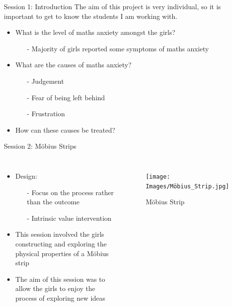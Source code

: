 \documentclass{beamer}  %
\begin{document}

\begin{frame}{Session 1: Introduction}
    The aim of this project is very individual, so it is important to get to know the students I am working with.
    \begin{itemize}
        \item What is the level of maths anxiety amongst the girls?
        \begin{itemize}
            \item[-]Majority of girls reported some symptoms of maths anxiety
        \end{itemize}
        \item What are the causes  of maths anxiety?
        \begin{itemize}
            \item[-] Judgement
            \item[-] Fear of being left behind
            \item[-] Frustration
        \end{itemize}
        \item How can these causes be treated?
    \end{itemize}
\end{frame}

\begin{frame}{Session 2: M\"{o}bius Strips}

    \begin{columns}
        \begin{itemize}
            \item Design:
            \begin{itemize}
                \item[-] Focus on the process rather than the outcome
                \item[-] Intrinsic value intervention
            \end{itemize} 
            \item This session involved the girls constructing and exploring the physical properties of a M\"{o}bius strip
            \item The aim of this session was to allow the girls to enjoy the process of exploring new ideas 
            
        \end{itemize}
        \begin{figure}
            \texttt{[image: Images/Möbius\_Strip.jpg]}
            \caption{M\"{o}bius Strip}
        \end{figure}
    \end{columns}
\end{frame}
\end{document}
